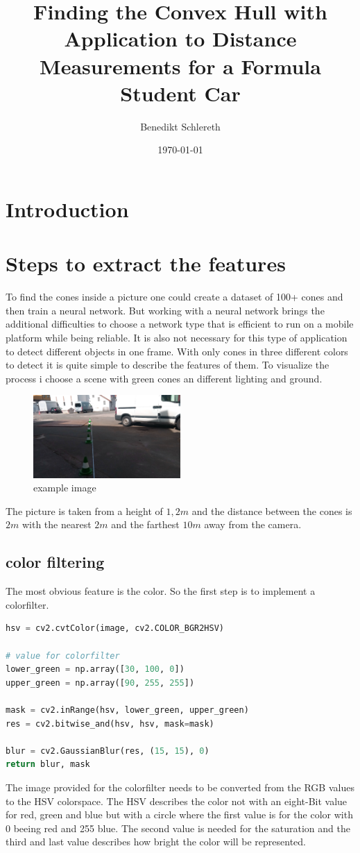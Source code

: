 \documentclass[10pt,a4paper]{article}
\title{Finding the Convex Hull with Application to Distance Measurements for a Formula Student Car}
\author{Benedikt Schlereth}
\date{\today}
\begin{document}
	\maketitle
	\tableofcontents
	
	\section{Introduction}
	
	
	\section{Steps to extract the features}
	To find the cones inside a picture one could create a dataset of 100+ cones and then train a neural network. But working with a neural network brings the additional difficulties to choose a network type that is efficient to run on a mobile platform while being reliable.
	It is also not necessary for this type of application to detect different objects in one frame.
	With only cones in three different colors to detect it is quite simple to describe the features of them.
	To visualize the process i choose a scene with green cones an different lighting and ground.
	\begin{figure}[h]
		\centering
		\includegraphics[width=0.5\textwidth]{Abb/start.png}
		\caption{example image}
		\label{example image}
	\end{figure}
	The picture is taken from a height of $1,2 m$ and the distance between the cones is $2m$ with the nearest $2m$ and the farthest $10m$ away from the camera.
	 
	\subsection{color filtering}
	The most obvious feature is the color. So the first step is to implement a colorfilter.
	\begin{lstlisting}[language=Python]
hsv = cv2.cvtColor(image, cv2.COLOR_BGR2HSV)
	
# value for colorfilter
lower_green = np.array([30, 100, 0])
upper_green = np.array([90, 255, 255])
	
mask = cv2.inRange(hsv, lower_green, upper_green)
res = cv2.bitwise_and(hsv, hsv, mask=mask)

blur = cv2.GaussianBlur(res, (15, 15), 0)
return blur, mask
	\end{lstlisting}
	The image provided for the colorfilter needs to be converted from the RGB values to the HSV colorspace.
	The HSV describes the color not with an eight-Bit value for red, green and blue but with a circle where the first value is for the color with 0 beeing red and 255 blue.
	The second value is needed for the saturation and the third and last value describes how bright the color will be represented.
	
\end{document}
